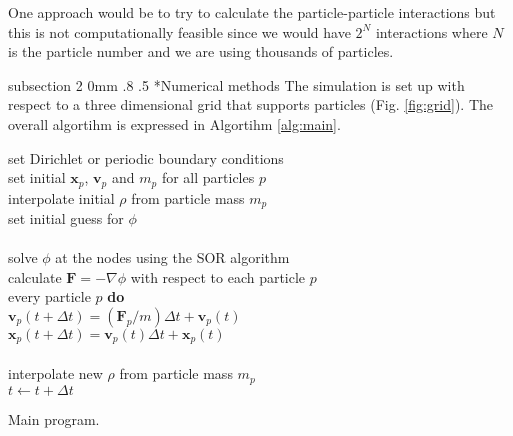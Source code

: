 \documentclass[notitlepage, 12pt]{article}
\makeatletter
\renewcommand{\subsection}{\@startsection    %
        {subsection}
        {2}
        {0mm}
        {.8\baselineskip}
        {.5\baselineskip}
        {\bfseries\normalsize}}
\makeatother
\begin{document}
One approach would be to try to calculate the particle-particle interactions but this is not computationally feasible since we would have $2^N$ interactions where $N$ is the particle number and we are using thousands of particles.  

\subsection*{Numerical methods}\label{ssec:numerical}
The simulation is set up with respect to a three dimensional grid that supports particles (Fig. \ref{fig:grid}).
The overall algortihm is expressed in Algortihm \ref{alg:main}.
\begin{algorithm}[H]
\hspace{0.1\textwidth}\parbox{.8\textwidth}{
\-\hspace{0ex}set Dirichlet or periodic boundary conditions\\
\-\hspace{0ex}set initial $\mathbf{x}_p$, $\mathbf{v}_p$ and $m_p$ for all particles $p$\\
\-\hspace{0ex}interpolate initial $\rho$ from particle mass $m_p$\\
\-\hspace{0ex}set initial guess for $\phi$\\
\-\hspace{0ex}{\bf loop}\\
\-\hspace{4ex}solve $\phi$ at the nodes using the SOR algorithm\\
\-\hspace{4ex}calculate $\mathbf{F}=-\nabla \phi$ with respect to each particle $p$\\
\-\hspace{4ex}{\bf for} every particle $p$ {\bf do}\\
\-\hspace{8ex}$\mathbf{v}_p(t+\Delta t) = (\mathbf{F}_p/m)\Delta t + \mathbf{v}_p(t)$\\
\-\hspace{8ex}$\mathbf{x}_p(t+\Delta t) = \mathbf{v}_p(t)\Delta t + \mathbf{x}_p(t)$\\
\-\hspace{4ex}{\bf end for}\\
\-\hspace{4ex}interpolate new $\rho$ from particle mass $m_p$\\
\-\hspace{4ex}$t\leftarrow t+\Delta t$\\
\-\hspace{0ex}{\bf end loop}}
\caption{Main program.}
\label{alg:main}
\end{algorithm}
\end{document}
